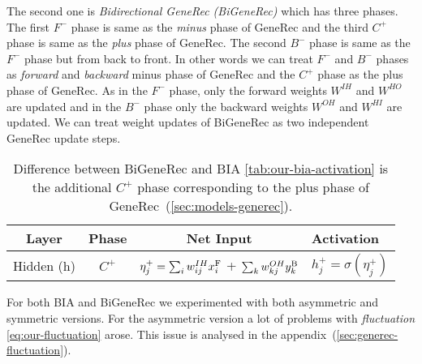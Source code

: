 The second one is \emph{Bidirectional GeneRec (BiGeneRec)} which has three phases. The first $F^{-}$ phase is same as the \emph{minus} phase of GeneRec and the third $C^{+}$ phase is same as the \emph{plus} phase of GeneRec. The second $B^{-}$ phase is same as the $F^{-}$ phase but from back to front. In other words we can treat $F^{-}$ and $B^{-}$ phases as \emph{forward} and \emph{backward} minus phase of GeneRec and the $C^{+}$ phase as the plus phase of GeneRec. As in the $F^{-}$ phase, only the forward weights $W^{IH}$ and $W^{HO}$ are updated and in the $B^{-}$ phase only the backward weights $W^{OH}$ and $W^{HI}$ are updated. We can treat weight updates of BiGeneRec as two independent GeneRec update steps. 

\begin{table}[H] 
  \centering
  \begin{tabular}{|cccl|}
    \hline
    Layer & Phase & Net Input & Activation\\
    \hline
    Hidden (h)   &  $C^{+}$  & $\eta^{+}_j = \sum_{i}w_{ij}^{IH}x^{\rm F}_i$ + $\sum_k w_{kj}^{OH}y^{\rm B}_k$ & $h^{+}_{j} = \sigma(\eta^{+}_j)$ \\
    \hline
  \end{tabular}
  \caption{Difference between BiGeneRec and BIA \ref{tab:our-bia-activation} is the additional $C^{+}$ phase corresponding to the plus phase of GeneRec~(\ref{sec:models-generec}).} 
  \label{tab:our-bigenerec-activation}
\end{table} 

For both BIA and BiGeneRec we experimented with both asymmetric and symmetric versions. For the asymmetric version a lot of problems with \emph{fluctuation} \ref{eq:our-fluctuation} arose. This issue is analysed in the appendix~(\ref{sec:generec-fluctuation}). 

